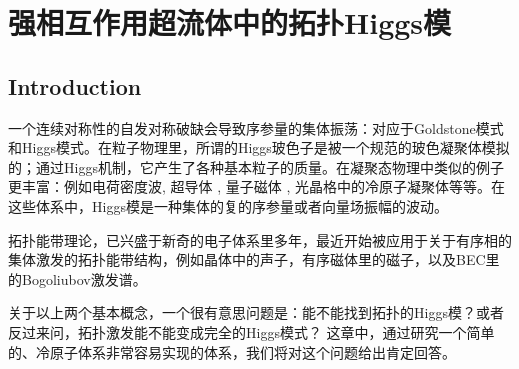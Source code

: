 
\chapter{强相互作用超流体中的拓扑Higgs模}\label{ch3}

\section{Introduction}

一个连续对称性的自发对称破缺会导致序参量的集体振荡：对应于Goldstone模式和Higgs模式。在粒子物理里，所谓的Higgs玻色子\cite{Higgs1964}是被一个规范的玻色凝聚体模拟的；通过Higgs机制，它产生了各种基本粒子的质量。在凝聚态物理中类似的例子更丰富：例如电荷密度波\cite{Yusupov2010}, 超导体 \cite{Tsuchiya2018}, 量子磁体 \cite{Su2020}, 光晶格中的冷原子凝聚体\cite{Liu2015}等等。在这些体系中，Higgs模是一种集体的复的序参量或者向量场振幅的波动。

拓扑能带理论\cite{Chiu2016}，已兴盛于新奇的电子体系里多年，最近开始被应用于关于有序相的集体激发的拓扑能带结构，例如晶体中的声子\cite{Prodan2009}，有序磁体里的磁子\cite{Shindou2013}，以及BEC里的Bogoliubov激发谱\cite{Pan2016}。

关于以上两个基本概念，一个很有意思问题是：能不能找到拓扑的Higgs模？或者反过来问，拓扑激发能不能变成完全的Higgs模式？
这章中，通过研究一个简单的、冷原子体系非常容易实现的体系，我们将对这个问题给出肯定回答。



